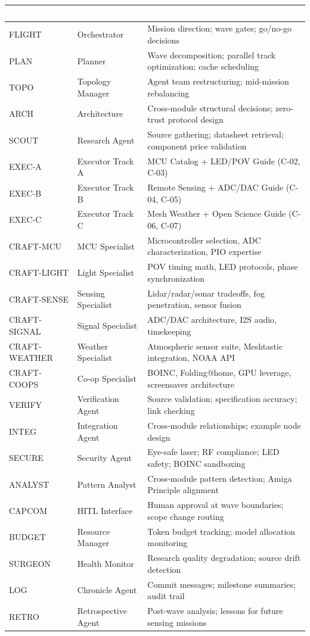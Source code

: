 \documentclass[11pt,letterpaper]{article}
\newcommand{\tableheader}[1]{\textbf{\sffamily\textcolor{white}{#1}}}
\begin{document}
\begin{center}
\begin{tabularx}{\textwidth}{L{2cm}L{3cm}X}
\toprule
{}
\tableheader{Role} & \tableheader{Agent} & \tableheader{Responsibility} \\
\midrule
FLIGHT & Orchestrator & Mission direction; wave gates; go/no-go decisions \\
PLAN & Planner & Wave decomposition; parallel track optimization; cache scheduling \\
TOPO & Topology Manager & Agent team restructuring; mid-mission rebalancing \\
ARCH & Architecture & Cross-module structural decisions; zero-trust protocol design \\
SCOUT & Research Agent & Source gathering; datasheet retrieval; component price validation \\
EXEC-A & Executor Track A & MCU Catalog + LED/POV Guide (C-02, C-03) \\
EXEC-B & Executor Track B & Remote Sensing + ADC/DAC Guide (C-04, C-05) \\
EXEC-C & Executor Track C & Mesh Weather + Open Science Guide (C-06, C-07) \\
CRAFT-MCU & MCU Specialist & Microcontroller selection, ADC characterization, PIO expertise \\
CRAFT-LIGHT & Light Specialist & POV timing math, LED protocols, phase synchronization \\
CRAFT-SENSE & Sensing Specialist & Lidar/radar/sonar tradeoffs, fog penetration, sensor fusion \\
CRAFT-SIGNAL & Signal Specialist & ADC/DAC architecture, I2S audio, timekeeping \\
CRAFT-WEATHER & Weather Specialist & Atmospheric sensor suite, Meshtastic integration, NOAA API \\
CRAFT-COOPS & Co-op Specialist & BOINC, Folding@home, GPU leverage, screensaver architecture \\
VERIFY & Verification Agent & Source validation; specification accuracy; link checking \\
INTEG & Integration Agent & Cross-module relationships; example node design \\
SECURE & Security Agent & Eye-safe laser; RF compliance; LED safety; BOINC sandboxing \\
ANALYST & Pattern Analyst & Cross-module pattern detection; Amiga Principle alignment \\
CAPCOM & HITL Interface & Human approval at wave boundaries; scope change routing \\
BUDGET & Resource Manager & Token budget tracking; model allocation monitoring \\
SURGEON & Health Monitor & Research quality degradation; source drift detection \\
LOG & Chronicle Agent & Commit messages; milestone summaries; audit trail \\
RETRO & Retrospective Agent & Post-wave analysis; lessons for future sensing missions \\
\bottomrule
\end{tabularx}
\end{center}
\end{document}
